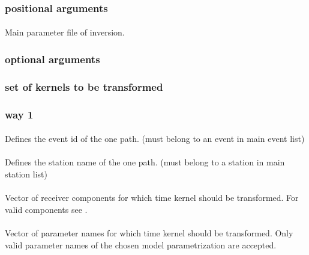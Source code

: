 \subsubsection{positional arguments}
\paragraph{}
Main parameter file of inversion.
\subsubsection{optional arguments}
\subsubsection{set of kernels to be transformed}
\subsubsection{way 1}
\paragraph{ }
Defines the event id of the one path. (must belong to an event in main event list)
\paragraph{ }
Defines the station name of the one path. (must belong to a station in main station list)
\paragraph{}
Vector of receiver components for which time kernel should be transformed. For valid components see .
\paragraph{}
Vector of parameter names for which time kernel should be transformed. Only valid parameter names of the chosen model parametrization are accepted. 
